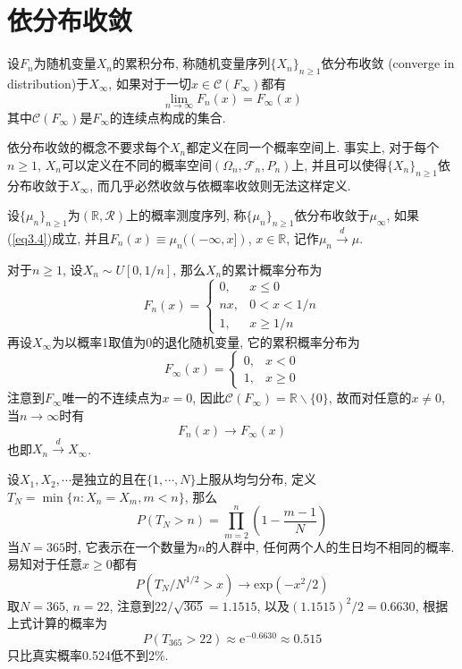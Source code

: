 \documentclass[cn, 12pt, math=mtpro2, bibstyle=apa, blue, twocol]{elegantbook}
\newcommand{\F}{\mathcal{F}}
\newcommand{\R}{\mathbb{R}}
\newcommand{\limn}{\lim_{n\to\infty}}
\begin{document}
\section{依分布收敛}
\begin{definition}
设$F_n$为随机变量$X_n$的累积分布, 称随机变量序列$\{X_n\}_{n\ge1}$依分布收敛 (converge in distribution)于$X_\infty$, 如果对于一切$x\in \mathcal{C}(F_\infty)$都有
\begin{equation}\label{eq3.4}
  \limn F_n(x)=F_\infty(x)
\end{equation}
其中$\mathcal{C}(F_\infty)$是$F_\infty$的连续点构成的集合.
\end{definition}
\begin{remark}
依分布收敛的概念不要求每个$X_n$都定义在同一个概率空间上. 事实上, 对于每个$n\ge1$, $X_n$可以定义在不同的概率空间$(\Omega_n,\F_n,P_n)$上, 并且可以使得$\{X_n\}_{n\ge1}$依分布收敛于$X_\infty$, 而几乎必然收敛与依概率收敛则无法这样定义.
\end{remark}
\begin{definition}
设$\{\mu_n\}_{n\ge1}$为$(\R,\mathcal{R})$上的概率测度序列, 称$\{\mu_n\}_{n\ge1}$依分布收敛于$\mu_{\infty}$, 如果(\ref{eq3.4})成立, 并且$F_n(x)\equiv\mu_n((-\infty,x])$, $x\in\R$, 记作$\mu_n\xrightarrow{d}\mu$.
\end{definition}
\begin{example}
对于$n\ge1$, 设$X_n\sim U[0,1/n]$, 那么$X_n$的累计概率分布为
$$F_n(x)=\begin{cases}
    0, &x\leq0 \\
    nx, & 0<x<1/n \\
    1, & x\ge1/n
  \end{cases}$$
  再设$X_\infty$为以概率1取值为0的退化随机变量, 它的累积概率分布为
  $$F_\infty(x)=\begin{cases}
             0, & x<0 \\
             1, & x\geq0
           \end{cases}$$
  注意到$F_\infty$唯一的不连续点为$x=0$, 因此$\mathcal{C}(F_\infty)=\R\backslash\{0\}$, 故而对任意的$x\neq0$, 当$n\to\infty$时有
  $$F_n(x)\to F_\infty(x)$$
  也即$X_n\xrightarrow{d}X_\infty$.

\end{example}
\begin{example}[生日问题]
设$X_1,X_2,\cdots$是独立的且在$\{1,\cdots,N\}$上服从均匀分布, 定义$T_N=\min\{n: X_n=X_m, m<n\}$, 那么
$$P(T_N>n)=\prod_{m=2}^{n}\left(1-\frac{m-1}{N}\right)$$
当$N=365$时, 它表示在一个数量为$n$的人群中, 任何两个人的生日均不相同的概率. 易知对于任意$x\ge0$都有
$$P(T_N/N^{1/2}>x)\to\text{exp}(-x^2/2)$$
取$N=365$, $n=22$, 注意到$22/\sqrt{365}=1.1515$, 以及$(1.1515)^2/2=0.6630$, 根据上式计算的概率为
$$P(T_{365}>22)\approx \text{e}^{-0.6630}\approx 0.515$$
只比真实概率0.524低不到2\%.
\end{example}
\end{document}
